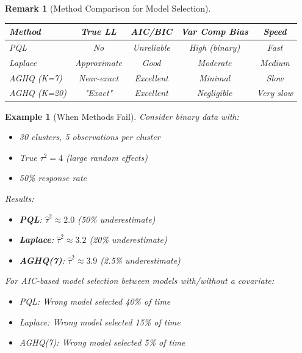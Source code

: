 \documentclass{article}
\newtheorem{remark}{Remark}
\newtheorem{example}{Example}
\begin{document}
\begin{remark}[Method Comparison for Model Selection]
\begin{center}
\begin{tabular}{|l|c|c|c|c|}
\hline
\textbf{Method} & \textbf{True LL} & \textbf{AIC/BIC} & \textbf{Var Comp Bias} & \textbf{Speed} \\
\hline
PQL & No & Unreliable & High (binary) & Fast \\
Laplace & Approximate & Good & Moderate & Medium \\
AGHQ (K=7) & Near-exact & Excellent & Minimal & Slow \\
AGHQ (K=20) & "Exact" & Excellent & Negligible & Very slow \\
\hline
\end{tabular}
\end{center}
\end{remark}

\begin{example}[When Methods Fail]
Consider binary data with:
\begin{itemize}
    \item 30 clusters, 5 observations per cluster
    \item True $\tau^2 = 4$ (large random effects)
    \item 50\% response rate
\end{itemize}

Results:
\begin{itemize}
    \item \textbf{PQL}: $\hat{\tau}^2 \approx 2.0$ (50\% underestimate)
    \item \textbf{Laplace}: $\hat{\tau}^2 \approx 3.2$ (20\% underestimate)
    \item \textbf{AGHQ(7)}: $\hat{\tau}^2 \approx 3.9$ (2.5\% underestimate)
\end{itemize}

For AIC-based model selection between models with/without a covariate:
\begin{itemize}
    \item PQL: Wrong model selected 40\% of time
    \item Laplace: Wrong model selected 15\% of time
    \item AGHQ(7): Wrong model selected 5\% of time
\end{itemize}
\end{example}
\end{document}
